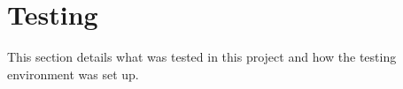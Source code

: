 \section{Testing}
This section details what was tested in this project and how the testing environment was set up.


